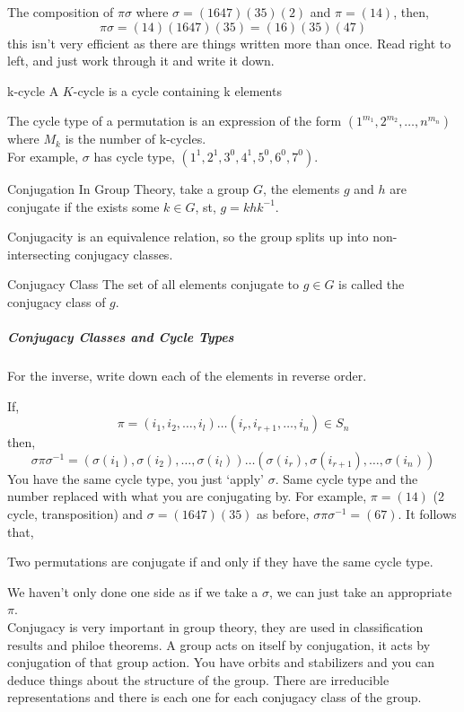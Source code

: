 \documentclass{article}
\begin{document}
The composition of $\pi\sigma$ where $\sigma = (1 6 4 7)(3 5)(2) $ and $\pi = (1 4)$, then,
$$ \pi\sigma = (1 4)(1 6 4 7)(3 5) = (1 6)(3 5)(4 7) $$
this isn't very efficient as there are things written more than once. Read right to left, and just work through it and write it down.

\begin{ndefi}{k-cycle}
  A $K$-cycle is a cycle containing k elements
\end{ndefi}
The cycle type of a permutation is an expression of the form $(1^{m_1}, 2^{m_2}, \dots, n^{m_n})$ where $M_k$ is the number of k-cycles.\\
For example, $\sigma$ has cycle type, $(1^1, 2^1, 3^0, 4^1, 5^0, 6^0, 7^0)$.\\

\begin{ndefi}{Conjugation}
  In Group Theory, take a group $G$, the elements $g$ and $h$ are conjugate if the exists some $k\in G$, st, $g = khk^{-1}$.
\end{ndefi}
Conjugacity is an equivalence relation, so the group splits up into non-intersecting conjugacy classes.\\
\begin{ndefi}{Conjugacy Class}
  The set of all elements conjugate to $g \in G$ is called the conjugacy class of $g$.
\end{ndefi}

\subparagraph{Conjugacy Classes and Cycle Types}
\begin{remark}
  For the inverse, write down each of the elements in reverse order.
\end{remark}

If,
$$ \pi = (i_1, i_2, \dots, i_l)\dots (i_r, i_{r+1}, \dots, i_n) \in S_n $$
then,
$$ \sigma\pi\sigma^{-1} = (\sigma(i_1), \sigma(i_2), \dots, \sigma(i_l))\dots (\sigma(i_r), \sigma(i_{r+1}), \dots, \sigma(i_n)) $$
You have the same cycle type, you just `apply' $\sigma$. Same cycle type and the number replaced with what you are conjugating by. For example, $\pi = (1 4)$ (2 cycle, transposition) and $\sigma = (1 6 4 7)(3 5)$ as before, $\sigma \pi \sigma^{-1} = (6 7) $. It follows that,
\begin{nlemma}
  Two permutations are conjugate if and only if they have the same cycle type.
\end{nlemma}
We haven't only done one side as if we take a $\sigma$, we can just take an appropriate $\pi$.\\

Conjugacy is very important in group theory, they are used in classification results and philoe theorems. A group acts on itself by conjugation, it acts by conjugation of that group action. You have orbits and stabilizers and you can deduce things about the structure of the group. There are irreducible representations and there is each one for each conjugacy class of the group.
\end{document}
